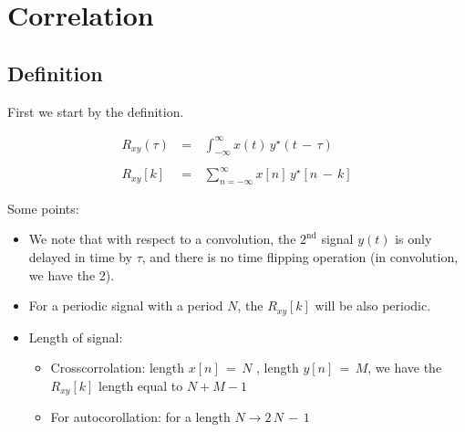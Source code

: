 


\chapter{Correlation}

\section{Definition}

First we start by the definition.

\begin{equation}
\begin{array}{lll}
R_{xy}(\tau) \, &=& \, \displaystyle\int_{-\infty}^{\infty} x(t) \, y^\star(t \, - \, \tau) \\ \\
R_{xy}[k]\, &=& \, \displaystyle\sum_{n = -\infty}^{\infty} x[n] \, y^\star[n \, - \, k] 
\end{array}
\end{equation}

Some points:

\begin{itemize}

\item We note that with respect to a convolution, the $\mathrm{2}^\mathrm{nd}$ signal $y(t)$ is only delayed in time by $\tau$, and there is no time flipping operation (in convolution, we have the 2).

\item For a periodic signal with a period $N$, the $R_{xy}[k]$ will be also periodic.

\item Length of signal:

    \begin{itemize}
        
        \item Crosscorrolation: length $x[n] \, = \, N$ , length $y[n] \, = \, M$, we have the $R_{xy}[k]$ length equal to $N + M - 1$ 

        
        \item For autocorollation: for a length $N \rightarrow 2\, N \, - \, 1$

        
    \end{itemize}

\end{itemize}